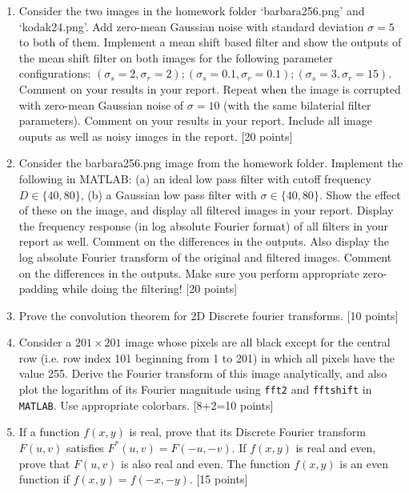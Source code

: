 \documentclass[11pt]{article}
\begin{document}
\begin{enumerate}
\item Consider the two images in the homework folder `barbara256.png' and `kodak24.png'. Add zero-mean Gaussian noise with standard deviation $\sigma = 5$ to both of them. Implement a mean shift based filter and show the outputs of the mean shift filter on both images for the following parameter configurations: $(\sigma_s = 2, \sigma_r = 2); (\sigma_s = 0.1, \sigma_r = 0.1); (\sigma_s = 3, \sigma_r = 15)$. Comment on your results in your report. Repeat when the image is corrupted with zero-mean Gaussian noise of $\sigma = 10$ (with the same bilaterial filter parameters). Comment on your results in your report. Include all image ouputs as well as noisy images in the report. \textsf{[20 points]}

\item Consider the barbara256.png image from the homework folder. Implement the following in MATLAB: (a) an ideal low pass filter with cutoff frequency $D \in \{40, 80\}$, (b) a Gaussian low pass filter with $\sigma \in \{40,80\}$. Show the effect of these on the image, and display all filtered images in your report. Display the frequency response (in log absolute Fourier format) of all filters in your report as well. Comment on the differences in the outputs. Also display the log absolute Fourier transform of the original and filtered images. Comment on the differences in the outputs. Make sure you perform appropriate zero-padding while doing the filtering! \textsf{[20 points]}

\item Prove the convolution theorem for 2D Discrete fourier transforms. \textsf{[10 points]}

\item Consider a $201 \times 201$ image whose pixels are all black except for the central row (i.e. row index 101 beginning from 1 to 201) in which all pixels have the value 255. Derive the Fourier transform of this image analytically, and also plot the logarithm of its Fourier magnitude using \texttt{fft2} and \texttt{fftshift} in \texttt{MATLAB}. Use appropriate colorbars.  
\textsf{[8+2=10 points]}

\item If a function $f(x,y)$ is real, prove that its Discrete Fourier transform $F(u,v)$ satisfies $F^*(u,v) = F(-u,-v)$. If $f(x,y)$ is real and even, prove that $F(u,v)$ is also real and even. The function $f(x,y)$ is an even function if $f(x,y) = f(-x,-y)$. \textsf{[15 points]}


\end{enumerate}
\end{document}
